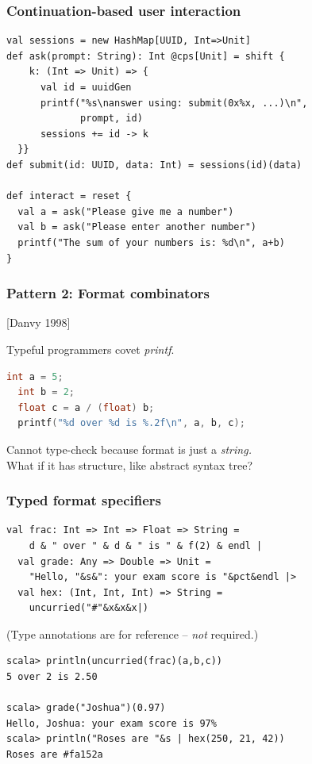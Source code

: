 \documentclass[14pt,t,usepdftitle=false,
xcolornames=x11names,svgnames,dvipsnames]{beamer}
\begin{document}
\begin{frame}[fragile]
  \frametitle{Continuation-based user interaction}
\begin{lstlisting}[style=scala,emph={[2]reset,shift}]
val sessions = new HashMap[UUID, Int=>Unit]
def ask(prompt: String): Int @cps[Unit] = shift {
    k: (Int => Unit) => {
      val id = uuidGen
      printf("%s\nanswer using: submit(0x%x, ...)\n",
             prompt, id)
      sessions += id -> k
  }}
def submit(id: UUID, data: Int) = sessions(id)(data)

def interact = reset {
  val a = ask("Please give me a number")
  val b = ask("Please enter another number")
  printf("The sum of your numbers is: %d\n", a+b)
}
\end{lstlisting}
\end{frame}



\begin{frame}[fragile]
  \frametitle{Pattern 2: Format combinators}
  \hfill[Danvy 1998]

  Typeful programmers covet \textit{printf}.
\begin{lstlisting}[language=C]
  int a = 5;
  int b = 2;
  float c = a / (float) b;
  printf("%d over %d is %.2f\n", a, b, c);
\end{lstlisting}
  Cannot type-check because format is just a \emph{string.}\\
  What if it has structure, like abstract syntax tree?
\end{frame}

\begin{frame}[fragile]
  \frametitle{Typed format specifiers}
\begin{lstlisting}[style=scala]
  val frac: Int => Int => Float => String =
    d & " over " & d & " is " & f(2) & endl |
  val grade: Any => Double => Unit =
    "Hello, "&s&": your exam score is "&pct&endl |>
  val hex: (Int, Int, Int) => String =
    uncurried("#"&x&x&x|)
\end{lstlisting}
  {\vskip-3mm\footnotesize\hfill(Type annotations are for reference --
    \emph{not} required.)}
\begin{lstlisting}[style=scalarepl]
scala> println(uncurried(frac)(a,b,c))
5 over 2 is 2.50

scala> grade("Joshua")(0.97)
Hello, Joshua: your exam score is 97%
scala> println("Roses are "&s | hex(250, 21, 42))
Roses are #fa152a
\end{lstlisting}
\end{frame}
\end{document}
